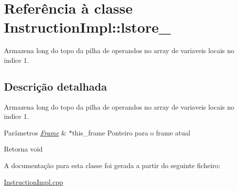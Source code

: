 \hypertarget{class_instruction_impl_1_1lstore__1}{}\section{Referência à classe Instruction\+Impl\+:\+:lstore\+\_}
\label{class_instruction_impl_1_1lstore__1}


Armazena long do topo da pilha de operandos no array de variaveis locais no indice 1.  




\subsection{Descrição detalhada}
Armazena long do topo da pilha de operandos no array de variaveis locais no indice 1. 


\begin{DoxyParams}{Parâmetros}
{\em \hyperlink{struct_frame}{Frame}} & $\ast$this\+\_\+frame Ponteiro para o frame atual \\
\hline
\end{DoxyParams}
\begin{DoxyReturn}{Retorna}
void 
\end{DoxyReturn}


A documentação para esta classe foi gerada a partir do seguinte ficheiro\+:\begin{DoxyCompactItemize}
\item 
\hyperlink{_instruction_impl_8cpp}{Instruction\+Impl.\+cpp}\end{DoxyCompactItemize}
